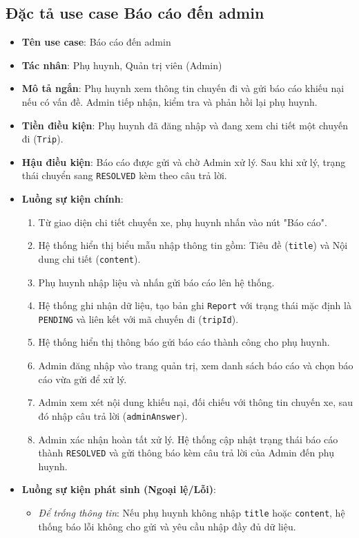 \documentclass[../DoAn.tex]{subfiles}
\begin{document}
\subsection{Đặc tả use case Báo cáo đến admin}
\begin{itemize}
    \item \textbf{Tên use case}: Báo cáo đến admin
    \item \textbf{Tác nhân}: Phụ huynh, Quản trị viên (Admin)
    \item \textbf{Mô tả ngắn}: Phụ huynh xem thông tin chuyến đi và gửi báo cáo khiếu nại nếu có vấn đề. Admin tiếp nhận, kiểm tra và phản hồi lại phụ huynh.
    \item \textbf{Tiền điều kiện}: Phụ huynh đã đăng nhập và đang xem chi tiết một chuyến đi (\texttt{Trip}).
    \item \textbf{Hậu điều kiện}: Báo cáo được gửi và chờ Admin xử lý. Sau khi xử lý, trạng thái chuyển sang \texttt{RESOLVED} kèm theo câu trả lời.
    \item \textbf{Luồng sự kiện chính}:
          \begin{enumerate}
              \item Từ giao diện chi tiết chuyến xe, phụ huynh nhấn vào nút "Báo cáo".
              \item Hệ thống hiển thị biểu mẫu nhập thông tin gồm: Tiêu đề (\texttt{title}) và Nội dung chi tiết (\texttt{content}).
              \item Phụ huynh nhập liệu và nhấn gửi báo cáo lên hệ thống.
              \item Hệ thống ghi nhận dữ liệu, tạo bản ghi \texttt{Report} với trạng thái mặc định là \texttt{PENDING} và liên kết với mã chuyến đi (\texttt{tripId}).
              \item Hệ thống hiển thị thông báo gửi báo cáo thành công cho phụ huynh.
              \item Admin đăng nhập vào trang quản trị, xem danh sách báo cáo và chọn báo cáo vừa gửi để xử lý.
              \item Admin xem xét nội dung khiếu nại, đối chiếu với thông tin chuyến xe, sau đó nhập câu trả lời (\texttt{adminAnswer}).
              \item Admin xác nhận hoàn tất xử lý. Hệ thống cập nhật trạng thái báo cáo thành \texttt{RESOLVED} và gửi thông báo kèm câu trả lời của Admin đến phụ huynh.
          \end{enumerate}
    \item \textbf{Luồng sự kiện phát sinh (Ngoại lệ/Lỗi)}:
          \begin{itemize}
              \item \textit{Để trống thông tin}: Nếu phụ huynh không nhập \texttt{title} hoặc \texttt{content}, hệ thống báo lỗi không cho gửi và yêu cầu nhập đầy đủ dữ liệu.
          \end{itemize}
\end{itemize}
\end{document}
